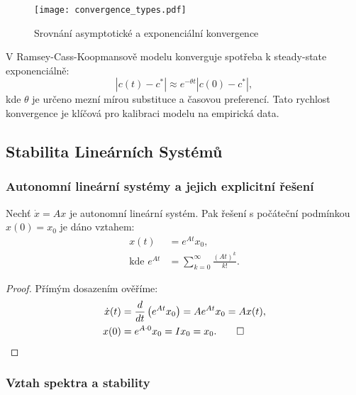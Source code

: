 \begin{figure}[H]
\centering
\texttt{[image: convergence\_types.pdf]}
\caption{Srovnání asymptotické a exponenciální konvergence}
\label{fig:convergence_types}
\end{figure}

\begin{application}
V Ramsey-Cass-Koopmansově modelu konverguje spotřeba k steady-state exponenciálně:
\[
|c(t) - c^*| \approx e^{-\theta t}|c(0) - c^*|,
\]
kde $\theta$ je určeno mezní mírou substituce a časovou preferencí. Tato rychlost konvergence je klíčová pro kalibraci modelu na empirická data.
\end{application}

\spc

\subsection{Stabilita Lineárních Systémů}

\subsubsection{Autonomní lineární systémy a jejich explicitní řešení}

\begin{theorem}
Nechť $\dot{x} = Ax$ je autonomní lineární systém. Pak řešení s počáteční podmínkou $x(0) = x_0$ je dáno vztahem:
\begin{align*}
x(t) &= e^{At}x_0, \\
\text{kde } e^{At} &= \sum_{k=0}^\infty \frac{(At)^k}{k!}.
\end{align*}
\end{theorem}

\begin{proof}
Přímým dosazením ověříme:
\begin{align*}
\dot{x}(t) &= \frac{d}{dt}\left(e^{At}x_0\right) = A e^{At}x_0 = Ax(t), \\
x(0) &= e^{A\cdot 0}x_0 = I x_0 = x_0. \qed
\end{align*}
\end{proof}

\subsubsection{Vztah spektra a stability}

